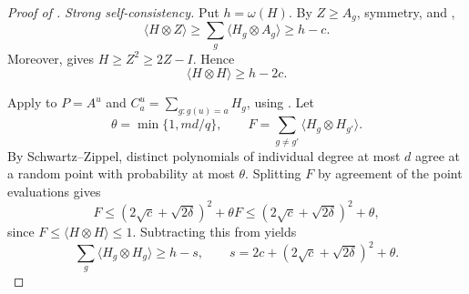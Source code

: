 \documentclass[11pt]{article}
\theoremstyle{definition}
\begin{document}
\begin{proof}[Proof of ]
\medskip\noindent\emph{Strong self-consistency.}
Put $h=\omega(H)$.  By $Z\geq A_g$, symmetry, and
,
\[
 \langle H\otimes Z\rangle
 \geq\sum_g\langle H_g\otimes A_g\rangle\geq h-c.
\]
Moreover,  gives
$H\geq Z^2\geq2Z-I$.  Hence
\begin{equation}\label{eq:self-improvement-total-mass}
 \langle H\otimes H\rangle\geq h-2c.
\end{equation}

Apply  to $P=A^u$ and
$C_a^u=\sum_{g:g(u)=a}H_g$, using
.
Let
\[
 \theta=\min\{1,md/q\},\qquad
 F=\sum_{g\ne g'}\langle H_g\otimes H_{g'}\rangle.
\]
By Schwartz--Zippel, distinct polynomials of individual degree at
most $d$ agree at a random point with probability at most $\theta$.  Splitting $F$ by agreement of the
point evaluations gives
\[
 F\leq(2\sqrt c+\sqrt{2\delta})^2+\theta F
   \leq(2\sqrt c+\sqrt{2\delta})^2+\theta,
\]
since $F\leq\langle H\otimes H\rangle\leq1$.  Subtracting this
from  yields
\begin{equation}\label{eq:self-improvement-short-self-consistency}
 \sum_g\langle H_g\otimes H_g\rangle\geq h-s,
 \qquad
 s=2c+(2\sqrt c+\sqrt{2\delta})^2+\theta.
\end{equation}


\end{proof}
\end{document}
